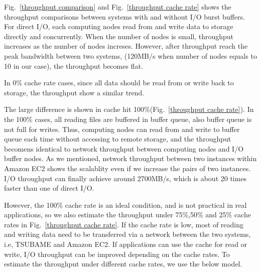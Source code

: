Fig.~\ref{throughput comparison} and Fig.~\ref{throughput cache rate} shows the throughput comparisons between systems  with and without I/O burst buffers.
For direct I/O, each computing nodes read from and write data to storage directly and concurrently.
When the number of nodes is small, throughput increases as the number of nodes increses.
However, after throughput reach the peak bandwidth between two systems, (120MB/s when number of nodes equals to 10 in our case), 
the throughput becomes flat. %

In 0\% cache rate cases, since all data should be read from or write back to storage, 
the throughput show a similar trend.%

The large difference is shown in cache hit 100\%(Fig.~\ref{throughput cache rate}).
In the 100\% cases, all reading files are buffered in buffer queue, 
also buffer queue is not full for writes.
Thus, computing nodes can read from and write to buffer queue each time without accessing to remote storage, 
and the throughput becomens identical to network throughput between computing nodes and I/O buffer nodes.
As we mentioned, network throughput between two instances within Amazon EC2 shows the scalablity even if we increase the pairs of two instances.
I/O throughput can finally achieve around 2700MB/s, which is about 20 times faster than one of direct I/O.%

However, the 100\% cache rate is an ideal condition, and is not practical in real applications, 
so we also estimate the throughput under 75\%,50\% and 25\% cache rates in Fig.~\ref{throughput cache rate}.
If the cache rate is low, most of reading and writing data need to be transferred via a network between the two systems, i.e, TSUBAME and Amazon EC2.
If applications can use the cache for read or write, I/O throughput can be improved depending on the cache rates.
To estimate the throughput under different cache rates, we use the below model.
 

